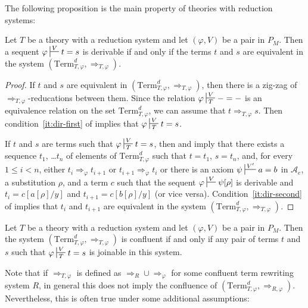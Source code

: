 \documentclass[reqno]{amsart}
\theoremstyle{definition}
\theoremstyle{remark}
\newcommand{\Term}{\mathrm{Term}}
\numberwithin{figure}{section}
\begin{document}
The following proposition is the main property of theories with reduction systems:

\begin{prop}
Let $T$ be a theory with a reduction system and let $(\varphi,V)$ be a pair in $P_M$.
Then a sequent $\varphi \sststile{}{V} t = s$ is derivable if and only if the terms $t$ and $s$ are equivalent in the system $(\Term_{T,\varphi}^d,\Rightarrow_{T,\varphi})$.
\end{prop}
\begin{proof}
If $t$ and $s$ are equivalent in $(\Term_{T,\varphi}^d,\Rightarrow_{T,\varphi})$, then there is a zig-zag of $\Rightarrow_{T,\varphi}$-reducations between them.
Since the relation $\varphi \sststile{T}{V} - = -$ is an equivalence relation on the set $\Term_{T,\varphi}^d$, we can assume that $t \Rightarrow_{T,\varphi} s$.
Then condition~\eqref{it:dir-first} of  implies that $\varphi \sststile{T}{V} t = s$.

If $t$ and $s$ are terms such that $\varphi \sststile{T}{V} t = s$, then  and  imply that
there exists a sequence $t_1$, \ldots $t_n$ of elements of $\Term^d_{T,\varphi}$ such that $t = t_1$, $s = t_n$, and, for every $1 \leq i < n$,
either $t_i \Rightarrow_\varphi t_{i+1}$ or $t_{i+1} \Rightarrow_\varphi t_i$ or there is an axiom $\psi \sststile{}{V'} a = b$ in $\mathcal{A}_e$, a substitution $\rho$, and a term $c$ such that
the sequent $\varphi \sststile{}{V} \psi[\rho]$ is derivable and $t_i = c[a[\rho]/y]$ and $t_{i+1} = c[b[\rho]/y]$ (or vice versa).
Condition~\eqref{it:dir-second} of  implies that $t_i$ and $t_{i+1}$ are equivalent in the system $(\Term_{T,\varphi}^d,\Rightarrow_{T,\varphi})$.
\end{proof}

\begin{cor}
Let $T$ be a theory with a reduction system and let $(\varphi,V)$ be a pair in $P_M$.
Then the system $(\Term_{T,\varphi}^d,\Rightarrow_{T,\varphi})$ is confluent if and only if any pair of terms $t$ and $s$ such that $\varphi \sststile{T}{V} t = s$ is joinable in this system.
\end{cor}

Note that if $\Rightarrow_{T,\varphi}$ is defined as $\Rightarrow_R \cup \Rightarrow_\varphi$ for some confluent term rewriting system $R$,
in general this does not imply the confluence of $(\Term_{T,\varphi}^d,\Rightarrow_{R,\varphi})$.
Nevertheless, this is often true under some additional assumptions:
\end{document}
